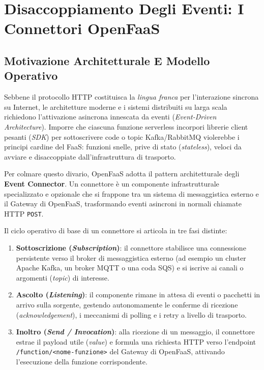 \documentclass[11pt, a4paper]{article}
\begin{document}
\newpage

\section{Disaccoppiamento Degli Eventi: I Connettori OpenFaaS}

\subsection{Motivazione Architetturale E Modello Operativo}
Sebbene il protocollo HTTP costituisca la \emph{lingua franca} per l'interazione sincrona su Internet, le architetture moderne e i sistemi distribuiti su larga scala richiedono l'attivazione asincrona innescata da eventi (\emph{Event-Driven Architecture}). Imporre che ciascuna funzione serverless incorpori librerie client pesanti (\emph{SDK}) per sottoscrivere code o topic Kafka/RabbitMQ violerebbe i principi cardine del FaaS: funzioni snelle, prive di stato (\emph{stateless}), veloci da avviare e disaccoppiate dall'infrastruttura di trasporto.

Per colmare questo divario, OpenFaaS adotta il pattern architetturale degli \textbf{Event Connector}. Un connettore è un componente infrastrutturale specializzato e opzionale che si frappone tra un sistema di messaggistica esterno e il Gateway di OpenFaaS, trasformando eventi asincroni in normali chiamate HTTP \texttt{POST}.


Il ciclo operativo di base di un connettore si articola in tre fasi distinte:
\begin{enumerate}
    \item \textbf{Sottoscrizione (\emph{Subscription})}: il connettore stabilisce una connessione persistente verso il broker di messaggistica esterno (ad esempio un cluster Apache Kafka, un broker MQTT o una coda SQS) e si iscrive ai canali o argomenti (\emph{topic}) di interesse.
    \item \textbf{Ascolto (\emph{Listening})}: il componente rimane in attesa di eventi o pacchetti in arrivo sulla sorgente, gestendo autonomamente le conferme di ricezione (\emph{acknowledgement}), i meccanismi di polling e i retry a livello di trasporto.
    \item \textbf{Inoltro (\emph{Send / Invocation})}: alla ricezione di un messaggio, il connettore estrae il payload utile (\emph{value}) e formula una richiesta HTTP verso l'endpoint \texttt{/function/<nome-funzione>} del Gateway di OpenFaaS, attivando l'esecuzione della funzione corrispondente.
\end{enumerate}
\end{document}
